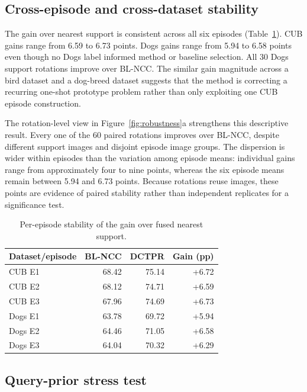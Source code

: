 \documentclass[10pt,twocolumn]{article}
\newcommand{\method}{\textsc{DCTPR}\xspace}
\begin{document}
\subsection{Cross-episode and cross-dataset stability}

The gain over nearest support is consistent across all six episodes
(Table~\ref{tab:episodes}). CUB gains range from 6.59 to 6.73 points. Dogs gains
range from 5.94 to 6.58 points even though no Dogs label informed method or
baseline selection. All 30 Dogs support rotations improve over BL-NCC. The
similar gain magnitude across a bird dataset and a dog-breed dataset suggests
that the method is correcting a recurring one-shot prototype problem rather
than only exploiting one CUB episode construction.

The rotation-level view in Figure~\ref{fig:robustness}a strengthens this
descriptive result. Every one of the 60 paired rotations improves over BL-NCC,
despite different support images and disjoint episode image groups. The
dispersion is wider within episodes than the variation among episode means:
individual gains range from approximately four to nine points, whereas the six
episode means remain between 5.94 and 6.73 points. Because rotations reuse
images, these points are evidence of paired stability rather than independent
replicates for a significance test.

\begin{table}[t]
\centering
\caption{Per-episode stability of the gain over fused nearest support.}
\label{tab:episodes}
\begin{tabular}{lrrr}
\toprule
Dataset/episode & BL-NCC & \method & Gain (pp) \\
\midrule
CUB E1 & 68.42 & 75.14 & +6.72 \\
CUB E2 & 68.12 & 74.71 & +6.59 \\
CUB E3 & 67.96 & 74.69 & +6.73 \\
Dogs E1 & 63.78 & 69.72 & +5.94 \\
Dogs E2 & 64.46 & 71.05 & +6.58 \\
Dogs E3 & 64.04 & 70.32 & +6.29 \\
\bottomrule
\end{tabular}
\end{table}

\subsection{Query-prior stress test}
\label{sec:priorstress}
\end{document}
